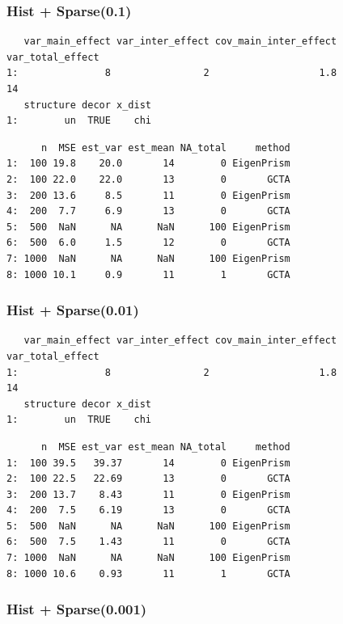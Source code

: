 \documentclass[]{article}
\begin{document}
\subsubsection{Hist + Sparse(0.1)}\label{hist-sparse0.1}

\begin{verbatim}
   var_main_effect var_inter_effect cov_main_inter_effect var_total_effect
1:               8                2                   1.8               14
   structure decor x_dist
1:        un  TRUE    chi
\end{verbatim}

\begin{verbatim}
      n  MSE est_var est_mean NA_total     method
1:  100 19.8    20.0       14        0 EigenPrism
2:  100 22.0    22.0       13        0       GCTA
3:  200 13.6     8.5       11        0 EigenPrism
4:  200  7.7     6.9       13        0       GCTA
5:  500  NaN      NA      NaN      100 EigenPrism
6:  500  6.0     1.5       12        0       GCTA
7: 1000  NaN      NA      NaN      100 EigenPrism
8: 1000 10.1     0.9       11        1       GCTA
\end{verbatim}

\subsubsection{Hist + Sparse(0.01)}\label{hist-sparse0.01}

\begin{verbatim}
   var_main_effect var_inter_effect cov_main_inter_effect var_total_effect
1:               8                2                   1.8               14
   structure decor x_dist
1:        un  TRUE    chi
\end{verbatim}

\begin{verbatim}
      n  MSE est_var est_mean NA_total     method
1:  100 39.5   39.37       14        0 EigenPrism
2:  100 22.5   22.69       13        0       GCTA
3:  200 13.7    8.43       11        0 EigenPrism
4:  200  7.5    6.19       13        0       GCTA
5:  500  NaN      NA      NaN      100 EigenPrism
6:  500  7.5    1.43       11        0       GCTA
7: 1000  NaN      NA      NaN      100 EigenPrism
8: 1000 10.6    0.93       11        1       GCTA
\end{verbatim}

\subsubsection{Hist + Sparse(0.001)}\label{hist-sparse0.001}
\end{document}
